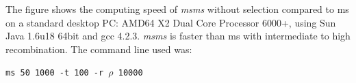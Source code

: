 \documentclass[portrait,final]{baposter}
\begin{document}
\begin{poster}
{

The figure shows the computing speed of {\it msms} without selection compared to
{\sc ms} on a standard desktop PC:  AMD64 X2 Dual Core Processor 6000+, using Sun
Java 1.6u18 64bit and gcc 4.2.3.
{\it msms} is faster than {\sc ms} with intermediate to high
recombination. The command line used was:

{\tt ms 50 1000 -t 100 -r $\rho$ 10000}

\vspace{0.4em}
} 

\end{poster}
\end{document}
